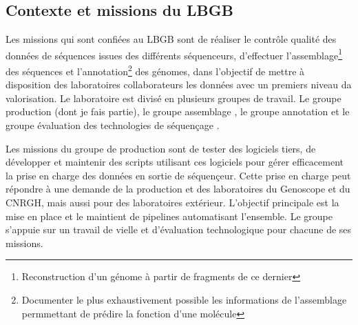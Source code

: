 \subsection{Contexte et missions du LBGB}
Les missions qui sont confiées au LBGB sont de réaliser le contrôle qualité des données de séquences issues des différents séquenceurs, d'effectuer l'assemblage\footnote{Reconstruction d'un génome à partir de fragments de ce dernier} des séquences et l'annotation\footnote{Documenter le plus exhaustivement possible les informations de l'assemblage permmettant de prédire la fonction d'une molécule} des génomes, dans l'objectif de mettre à disposition des laboratoires collaborateurs les données avec un premiers niveau da valorisation. Le laboratoire est divisé en plusieurs groupes de travail. Le groupe \og production \fg{} (dont je fais partie), le groupe \og assemblage \fg{}, le groupe \og annotation \fg{} et le groupe \og évaluation des technologies de séquençage \fg{}.

Les missions du groupe de \og production \fg{} sont de tester des logiciels tiers, de développer et maintenir des scripts utilisant ces logiciels pour gérer efficacement la prise en charge des données en sortie de séquençeur. Cette prise en charge peut répondre à une demande de la production et des laboratoires du Genoscope et du CNRGH, mais aussi pour des laboratoires extérieur. L'objectif principale est la mise en place et le maintient de pipelines automatisant l'ensemble. Le groupe s'appuie sur un travail de vielle et d'évaluation technologique pour chacune de ses missions. 


